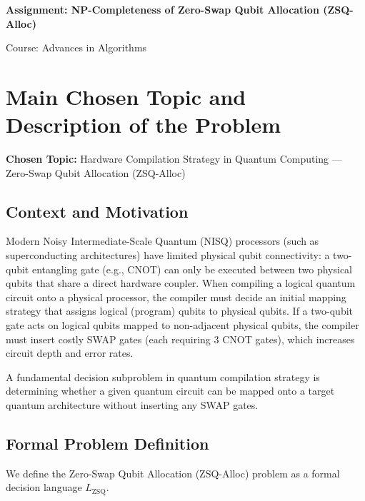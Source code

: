 \documentclass[11pt, a4paper]{article}
\begin{document}
\begin{center}
    {\Large\bfseries\color{accent} Assignment: NP-Completeness of Zero-Swap Qubit Allocation (ZSQ-Alloc)\par}
    \vspace{0.4em}
    {\normalsize\color{muted} Course: Advances in Algorithms\par}
\end{center}
\vspace{0.2em}
\noindent{\color{accent}\rule{\linewidth}{0.8pt}}
\vspace{0.6em}

\section{Main Chosen Topic and Description of the Problem}

\noindent\textbf{Chosen Topic:} Hardware Compilation Strategy in Quantum Computing --- Zero-Swap Qubit Allocation (ZSQ-Alloc)

\subsection*{Context and Motivation}
Modern Noisy Intermediate-Scale Quantum (NISQ) processors (such as superconducting architectures) have limited physical qubit connectivity: a two-qubit entangling gate (e.g., CNOT) can only be executed between two physical qubits that share a direct hardware coupler. When compiling a logical quantum circuit onto a physical processor, the compiler must decide an initial mapping strategy that assigns logical (program) qubits to physical qubits. If a two-qubit gate acts on logical qubits mapped to non-adjacent physical qubits, the compiler must insert costly SWAP gates (each requiring 3 CNOT gates), which increases circuit depth and error rates.

A fundamental decision subproblem in quantum compilation strategy is determining whether a given quantum circuit can be mapped onto a target quantum architecture without inserting any SWAP gates.

\subsection*{Formal Problem Definition}
We define the Zero-Swap Qubit Allocation (ZSQ-Alloc) problem as a formal decision language $L_{\text{ZSQ}}$.
\end{document}
